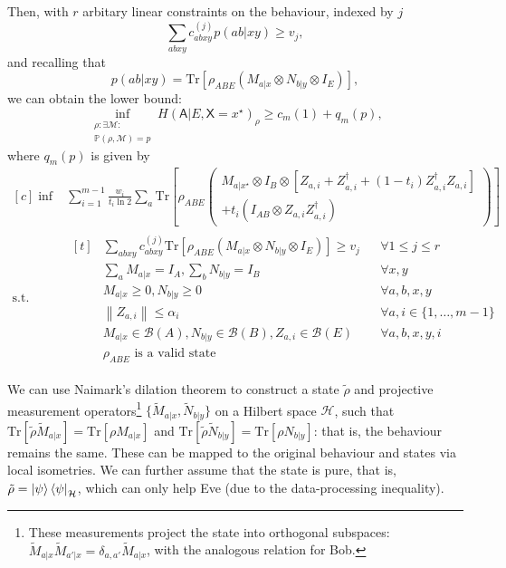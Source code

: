 \documentclass[10pt, a4paper]{article}
\numberwithin{equation}{section} %
\theoremstyle{definition}
\theoremstyle{plain}
\newcommand{\norm}[1]{\left\lVert#1\right\rVert}
\newcommand{\dintv}[2]{\mathopen\{#1,\ldots,#2\mathclose\}}
\newcommand{\?}{\mathrel{?}} %
\newcommand{\Tr}{\mathrm{Tr}} %
\newcommand{\Hs}{\mathcal{H}} %
\newcommand{\sM}{\mathcal{M}}
\newcommand{\sB}{\mathcal{B}}
\newcommand{\cP}{\mathbb{P}}
\newcommand{\crv}[1]{\mathsf{#1}}
\begin{document}
      Then, with \(r\) arbitary linear constraints on the behaviour, indexed by \(j\)
      \[ \sum_{abxy} c^{(j)}_{abxy} p(ab|xy) \geq v_j, \]
      and recalling that
      \[ p(ab|xy) = \Tr\left[\rho_{A B E} \left(M_{a|x} \otimes N_{b|y} \otimes I_{E}\right) \right], \]
      we can obtain the lower bound:
      \begin{equation}
        \inf_{\substack{\rho: \exists \sM : \\ \cP(\rho, \sM) = p}} H{(\crv{A}|E, \crv{X}=x^{\star})}_{\rho} \geq c_m(1) + q_m(p),
      \end{equation}
      where \(q_m(p)\) is given by
      \begin{equation}
        \begin{aligned}[c]
          \inf & \sum_{i=1}^{m-1} \frac{w_i}{t_i \ln 2} \sum_a \Tr\left[ 
            \rho_{A B E} \left(
            \begin{gathered}
            M_{a|x^{\star}} \otimes I_{B} \otimes \left[ Z_{a,i} + Z_{a,i}^{\dagger} + (1-t_i)  Z_{a,i}^{\dagger}Z_{a,i} \right] \\
            + t_i \left( I_{A B} \otimes Z_{a,i}Z_{a,i}^{\dagger}\right) 
            \end{gathered}
            \right)
          \right] \\
          \text{s.t.} & \begin{aligned}[t] 
            & \sum_{abxy} c^{(j)}_{abxy} \Tr\left[\rho_{A B E} \left(M_{a|x} \otimes N_{b|y} \otimes I_{E}\right) \right] \geq v_j & & \forall 1 \leq j \leq r \\
            & \sum_{a} M_{a|x} = I_{A}, \sum_{b} N_{b|y} = I_{B} & & \forall x, y \\
            & M_{a|x} \geq 0, N_{b|y} \geq 0 & & \forall a, b, x, y \\
            & \norm{Z_{a,i}} \leq \alpha_i & & \forall a, i \in \dintv{1}{m-1} \\
            & M_{a|x} \in \sB(A), N_{b|y} \in \sB(B), Z_{a,i} \in \sB(E) & & \forall a, b, x, y, i \\
            & \rho_{A B E} \text{ is a valid state} & &
          \end{aligned}
        \end{aligned}
      \end{equation}

      We can use Naimark's dilation theorem to construct a state \(\tilde{\rho}\) and projective measurement operators\footnote{These measurements project the state into orthogonal subspaces: \(\tilde{M}_{a|x}\tilde{M}_{a'|x} = \delta_{a,a'}\tilde{M}_{a|x}\), with the analogous relation for Bob.} \(\{\tilde{M}_{a|x}, \tilde{N}_{b|y}\}\) on a Hilbert space \(\Hs\), such that \(\Tr\left[\tilde{\rho}\tilde{M}_{a|x}\right] = \Tr\left[\rho M_{a|x}\right]\) and  \(\Tr\left[\tilde{\rho}\tilde{N}_{b|y}\right] = \Tr\left[\rho N_{b|y}\right]\): that is, the behaviour remains the same. These can be mapped to the original behaviour and states via local isometries. We can further assume that the state is pure, that is, \(\tilde{\rho} = {\ket{\psi}\bra{\psi}}_{\Hs}\), which can only help Eve (due to the data-processing inequality).
\end{document}
